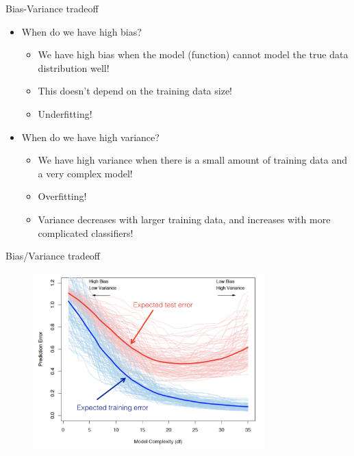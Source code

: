 \documentclass[xcolor={usenames,dvipsnames},handout]{beamer}
\begin{document}
\begin{frame}{Bias-Variance tradeoff}
\begin{itemize}
\item When do we have \alert{high bias}?
\begin{itemize}
\item  We have high bias when the model (function) cannot model the
true data distribution well!
\item   This doesn’t depend on the training data size!
\item   Underfitting!
\end{itemize}
\item When do we have \alert{high variance}?
\begin{itemize}
\item  We have high variance when there is a small amount of training
data and a very complex model!
\item   Overfitting!
\item  Variance decreases with larger training data, and increases with more complicated classifiers!
\end{itemize}
\end{itemize}
\end{frame}

\begin{frame}{Bias/Variance tradeoff}


\begin{figure}
\begin{center}
\includegraphics[width=0.8\textwidth]{overfitting_ex}
\end{center}
\end{figure}


\end{frame}
\end{document}
